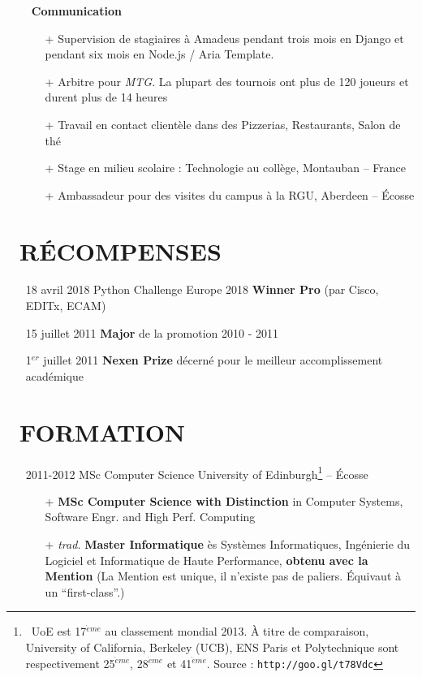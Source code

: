 \documentclass{res}
\begin{document}
\begin{resume}
	\begin{itemize}
	\item[] \faComments[regular]~\textbf{Communication}
		\begin{itemize}
									\item[+] Supervision de stagiaires \`a Amadeus pendant trois mois en Django et pendant six mois en Node.js / Aria Template.
                  \item[+] Arbitre pour \textit{MTG}. La plupart des tournois ont plus de 120 joueurs et durent plus de 14 heures
                  \item[+] Travail en contact client\`ele dans des Pizzerias, Restaurants, Salon de th\'e
                  \item[+] Stage en milieu scolaire : Technologie au coll\`ege, Montauban -- France

                  \item[+]  Ambassadeur pour des visites du campus \`a la RGU, Aberdeen -- \'Ecosse
		\end{itemize}
	\end{itemize}

\section{\faMedal~R\'ECOMPENSES}
\begin{itemize}
	\item[] 18 avril 2018 \tabto{4cm} Python Challenge Europe 2018 \textbf{Winner Pro} (par Cisco, EDITx, ECAM)
	\item[] 15 juillet 2011 \tabto{4cm} \textbf{Major} de la promotion 2010 - 2011
	\item[] 1$^{er}$ juillet 2011 \tabto{4cm} \textbf{Nexen Prize} d\'ecern\'e pour le meilleur accomplissement acad\'emique
\end{itemize}

\section{\faGraduationCap~FORMATION}
\begin{itemize} 
\item[] 2011-2012 \tabto{2cm} MSc Computer Science \hfill University of Edinburgh\footnote{~UoE est 17$^{\grave{e}me}$ au classement mondial 2013. \`A titre de comparaison, University of California, Berkeley (UCB), ENS Paris et Polytechnique sont respectivement 25$^{\grave{e}me}$, 28$^{\grave{e}me}$ et 41$^{\grave{e}me}$. Source : \texttt{http://goo.gl/t78Vdc}} -- \'Ecosse
	\begin{itemize}
		\item[+] \textbf{MSc Computer Science with Distinction} in Computer Systems, Software Engr. and High Perf. Computing
		\item[+] \textit{trad.} \textbf{Master Informatique} \`es Syst\`emes Informatiques, Ing\'enierie du Logiciel et Informatique de Haute Performance, \textbf{obtenu avec la Mention} (La Mention est unique, il n'existe pas de paliers. \'Equivaut \`a un ``first-class''.)
	\end{itemize}
	

\end{itemize}
\end{resume}
\end{document}
